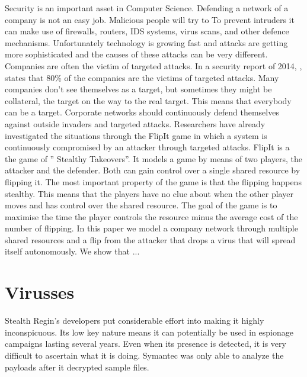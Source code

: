  
  Security is an important asset in Computer Science. Defending a network of a company is not an easy job. Malicious people will try to  To prevent intruders it can make use of firewalls, routers, IDS systems, virus scans, and other defence mechanisms. Unfortunately technology is growing fast and attacks are getting more sophisticated and the causes of these attacks can be very different.  Companies are often the victim of targeted attacks. In a security report of 2014, , states that 80\% of the companies are the victims of targeted attacks. Many companies don't see themselves as a target, but sometimes they might be collateral, the target on the way to the real target. This means that everybody can be a target. 
Corporate networks should continuously defend themselves against outside invaders and targeted attacks. Researchers have already investigated the situations through the FlipIt game in which a system is continuously compromised by an attacker through targeted attacks. 
FlipIt is a the game of '' Stealthy Takeovers''. It models a game by means of two players, the attacker and the defender. Both can gain control over a single shared resource by flipping it. The most important property of the game is that the flipping happens stealthy. This means that the players have no clue about when the other player moves and has control over the shared resource. The goal of the game is to maximise the time the player controls the resource minus the average cost of the number of flipping.
In this paper we model a company network through multiple shared resources and a flip from the attacker that drops a virus that will spread itself autonomously. We show that ...

\section{Virusses}

Stealth
Regin's developers put considerable effort into making it highly inconspicuous. Its low key nature means it can potentially be used in espionage campaigns lasting several years. Even when its presence is detected, it is very difficult to ascertain what it is doing. Symantec was only able to analyze the payloads after it decrypted sample files.

